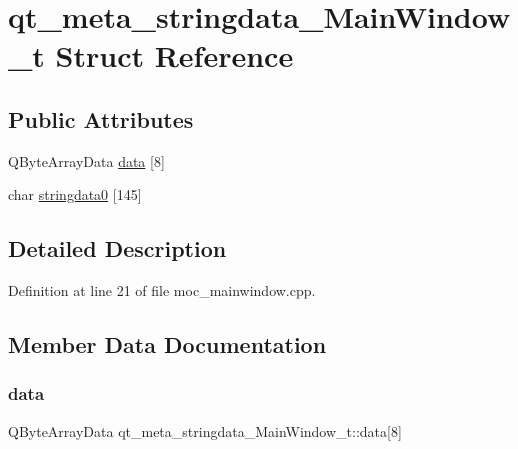 \hypertarget{structqt__meta__stringdata___main_window__t}{}\section{qt\+\_\+meta\+\_\+stringdata\+\_\+\+Main\+Window\+\_\+t Struct Reference}
\label{structqt__meta__stringdata___main_window__t}
\subsection*{Public Attributes}
\begin{DoxyCompactItemize}
\item 
Q\+Byte\+Array\+Data \mbox{\hyperlink{structqt__meta__stringdata___main_window__t_ae8888f3a82b4bd7597ba5dad592aeec6}{data}} \mbox{[}8\mbox{]}
\item 
char \mbox{\hyperlink{structqt__meta__stringdata___main_window__t_a87f8ccab1c2ccd9d86188ffea0918941}{stringdata0}} \mbox{[}145\mbox{]}
\end{DoxyCompactItemize}


\subsection{Detailed Description}


Definition at line 21 of file moc\+\_\+mainwindow.\+cpp.



\subsection{Member Data Documentation}
\mbox{\label{structqt__meta__stringdata___main_window__t_ae8888f3a82b4bd7597ba5dad592aeec6}} 
\subsubsection{\texorpdfstring{data}{data}}
{\footnotesize\ttfamily Q\+Byte\+Array\+Data qt\+\_\+meta\+\_\+stringdata\+\_\+\+Main\+Window\+\_\+t\+::data\mbox{[}8\mbox{]}}



